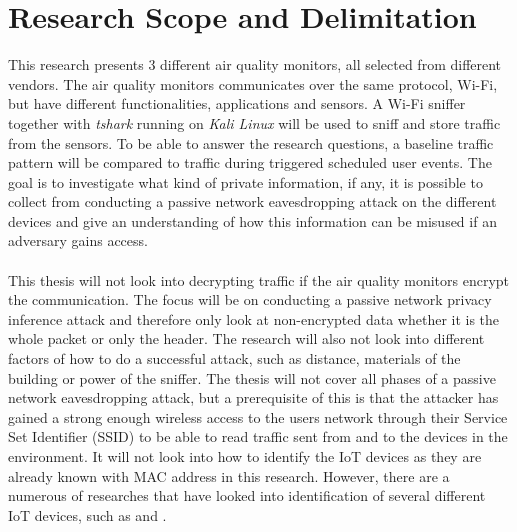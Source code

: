 \section{Research Scope and Delimitation}
This research presents 3 different air quality monitors, all selected from different vendors. The air quality monitors communicates over the same protocol, Wi-Fi, but have different functionalities, applications and sensors. A Wi-Fi sniffer together with \textit{tshark} running on \textit{Kali Linux} will be used to sniff and store traffic from the sensors. To be able to answer the research questions, a baseline traffic pattern will be compared to traffic during triggered scheduled user events. The goal is to investigate what kind of private information, if any, it is possible to collect from conducting a passive network eavesdropping attack on the different devices and give an understanding of how this information can be misused if an adversary gains access. 
\\\\
This thesis will not look into decrypting traffic if the air quality monitors encrypt the communication. The focus will be on conducting a passive network privacy inference attack and therefore only look at non-encrypted data whether it is the whole packet or only the header. The research will also not look into different factors of how to do a successful attack, such as distance, materials of the building or power of the sniffer. The thesis will not cover all phases of a passive network eavesdropping attack, but a prerequisite of this is that the attacker has gained a strong enough wireless access to the users network through their Service Set Identifier (SSID) to be able to read traffic sent from and to the devices in the environment. It will not look into how to identify the IoT devices as they are already known with MAC address in this research. However, there are a numerous of researches that have looked into identification of several different IoT devices, such as \cite{IdentifyIoT1} and \cite{IdentifyingIoT2}. 


